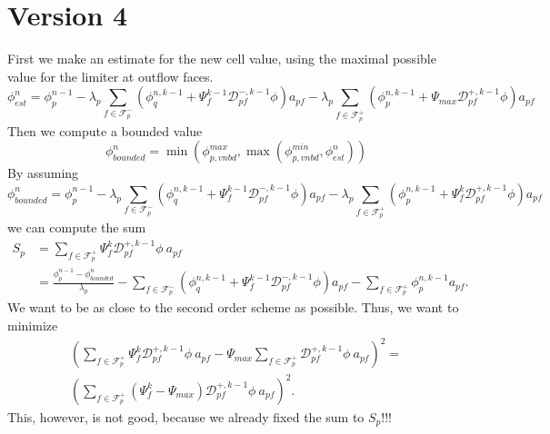 \documentclass[../thesis.tex]{subfiles}
\begin{document}
\section{Version 4}
First we make an estimate for the new cell value, using the maximal possible value for the limiter at outflow faces.
\begin{equation*}
	\phi_{est}^n = \phi_p^{n-1}
	- \lambda_p \sum_{f \in \mathcal{F}_p^-}
	\left( \phi_q^{n,k-1} + \Psi_{f}^{k-1} \mathcal{D}^{-,k-1}_{pf}\phi	\right) a_{pf}
	- \lambda_p\sum_{f \in \mathcal{F}_p^+}
	\left( \phi_p^{n,k-1} + \Psi_{max} \mathcal{D}^{+,k-1}_{pf}\phi \right) a_{pf}
\end{equation*}
Then we compute a bounded value
\begin{equation}
	\phi_{bounded}^n = \min\left( \phi_{p, vnbd}^{max}, \max\left( \phi_{p, vnbd}^{min}, \phi_{est}^n \right) \right)
\end{equation}
By assuming
\begin{equation}
	\phi_{bounded}^n = \phi_p^{n-1}
	- \lambda_p \sum_{f \in \mathcal{F}_p^-}
	\left( \phi_q^{n,k-1} + \Psi_{f}^{k-1} \mathcal{D}^{-,k-1}_{pf}\phi	\right) a_{pf}
	- \lambda_p\sum_{f \in \mathcal{F}_p^+}
	\left( \phi_p^{n,k-1} + \Psi_{f}^{k} \mathcal{D}^{+,k-1}_{pf}\phi \right) a_{pf}
\end{equation}
we can compute the sum
\begin{equation}
	\begin{split}
		S_p &=
		\sum_{f \in \mathcal{F}_p^+}
		\Psi_{f}^{k} \mathcal{D}^{+,k-1}_{pf}\phi\ a_{pf}\\
		&=
		\frac{\phi_p^{n-1} - \phi_{bounded}^n}{\lambda_p}
		- \sum_{f \in \mathcal{F}_p^-}
		\left( \phi_q^{n,k-1} + \Psi_{f}^{k-1} \mathcal{D}^{-,k-1}_{pf}\phi	\right) a_{pf}
		- \sum_{f \in \mathcal{F}_p^+}
		\phi_p^{n,k-1}a_{pf}.
	\end{split}
\end{equation}
We want to be as close to the second order scheme as possible.
Thus, we want to minimize
\begin{equation*}
	\begin{split}
		\left( \sum_{f \in \mathcal{F}_p^+}
		\Psi_{f}^{k} \mathcal{D}^{+,k-1}_{pf}\phi\ a_{pf}
		-
		\Psi_{max} \sum_{f \in \mathcal{F}_p^+}
		\mathcal{D}^{+,k-1}_{pf}\phi\ a_{pf} \right)^2
		=\\
		\left( \sum_{f \in \mathcal{F}_p^+}
		\left( \Psi_{f}^{k} - \Psi_{max} \right) \mathcal{D}^{+,k-1}_{pf}\phi\ a_{pf} \right)^2.
	\end{split}
\end{equation*}
This, however, is not good, because we already fixed the sum to \( S_p \)!!!
\end{document}

